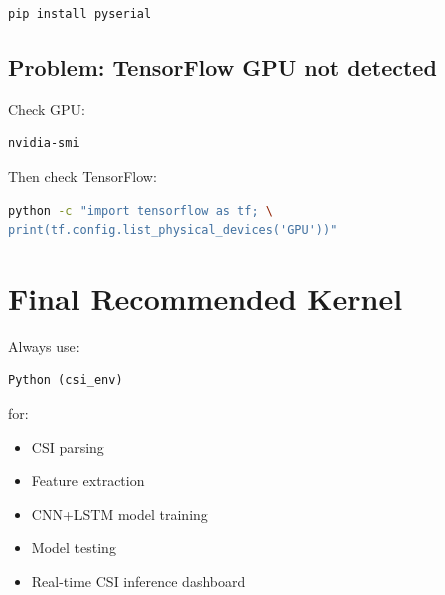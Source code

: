 \documentclass[12pt,a4paper]{article}
\begin{document}
\begin{lstlisting}[language=bash]
pip install pyserial
\end{lstlisting}

\subsection{Problem: TensorFlow GPU not detected}

Check GPU:

\begin{lstlisting}[language=bash]
nvidia-smi
\end{lstlisting}

Then check TensorFlow:

\begin{lstlisting}[language=bash]
python -c "import tensorflow as tf; \
print(tf.config.list_physical_devices('GPU'))"
\end{lstlisting}

\section{Final Recommended Kernel}

Always use:

\begin{verbatim}
Python (csi_env)
\end{verbatim}

for:

\begin{itemize}
    \item CSI parsing
    \item Feature extraction
    \item CNN+LSTM model training
    \item Model testing
    \item Real-time CSI inference dashboard
\end{itemize}
\end{document}
